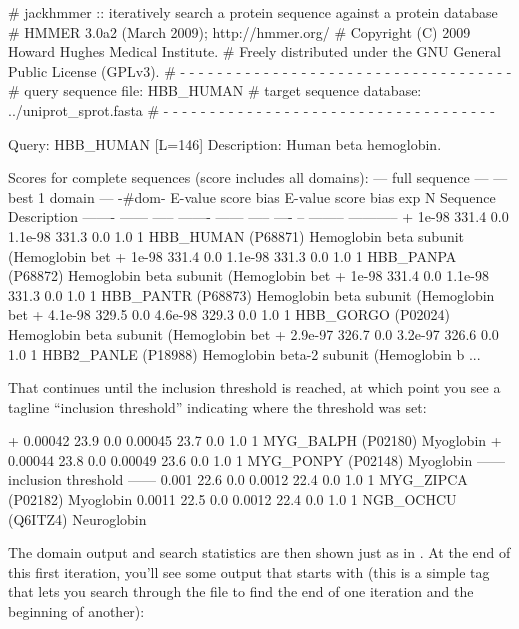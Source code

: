 \begin{sreoutput}
# jackhmmer :: iteratively search a protein sequence against a protein database
# HMMER 3.0a2 (March 2009); http://hmmer.org/
# Copyright (C) 2009 Howard Hughes Medical Institute.
# Freely distributed under the GNU General Public License (GPLv3).
# - - - - - - - - - - - - - - - - - - - - - - - - - - - - - - - - - - - -
# query sequence file:             HBB_HUMAN
# target sequence database:        ../uniprot_sprot.fasta
# - - - - - - - - - - - - - - - - - - - - - - - - - - - - - - - - - - - -

Query:       HBB_HUMAN  [L=146]
Description: Human beta hemoglobin.

Scores for complete sequences (score includes all domains):
   --- full sequence ---   --- best 1 domain ---    -#dom-
    E-value  score  bias    E-value  score  bias    exp  N  Sequence    Description
    ------- ------ -----    ------- ------ -----   ---- --  --------    -----------
+     1e-98  331.4   0.0    1.1e-98  331.3   0.0    1.0  1  HBB_HUMAN   (P68871) Hemoglobin beta subunit (Hemoglobin bet
+     1e-98  331.4   0.0    1.1e-98  331.3   0.0    1.0  1  HBB_PANPA   (P68872) Hemoglobin beta subunit (Hemoglobin bet
+     1e-98  331.4   0.0    1.1e-98  331.3   0.0    1.0  1  HBB_PANTR   (P68873) Hemoglobin beta subunit (Hemoglobin bet
+   4.1e-98  329.5   0.0    4.6e-98  329.3   0.0    1.0  1  HBB_GORGO   (P02024) Hemoglobin beta subunit (Hemoglobin bet
+   2.9e-97  326.7   0.0    3.2e-97  326.6   0.0    1.0  1  HBB2_PANLE  (P18988) Hemoglobin beta-2 subunit (Hemoglobin b
...
\end{sreoutput}

That continues until the inclusion threshold is reached, at which
point you see a tagline ``inclusion threshold'' indicating where the
threshold was set:

\begin{sreoutput}
+   0.00042   23.9   0.0    0.00045   23.7   0.0    1.0  1  MYG_BALPH   (P02180) Myoglobin
+   0.00044   23.8   0.0    0.00049   23.6   0.0    1.0  1  MYG_PONPY   (P02148) Myoglobin
  ------ inclusion threshold ------
      0.001   22.6   0.0     0.0012   22.4   0.0    1.0  1  MYG_ZIPCA   (P02182) Myoglobin
     0.0011   22.5   0.0     0.0012   22.4   0.0    1.0  1  NGB_OCHCU   (Q6ITZ4) Neuroglobin
\end{sreoutput}

The domain output and search statistics are then shown just as in
. At the end of this first iteration, you'll see some
output that starts with  (this is a simple tag that lets you
search through the file to find the end of one iteration and the
beginning of another):

